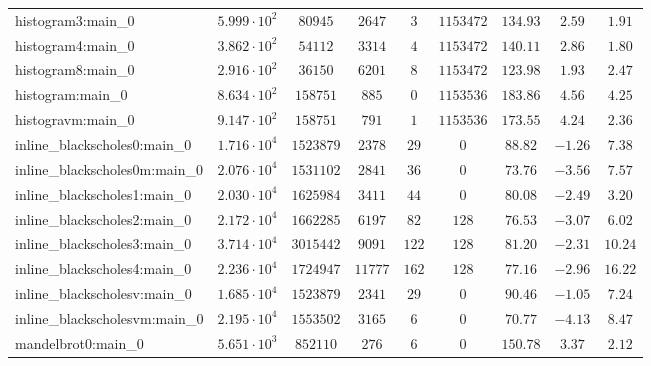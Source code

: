 \begin{tabular}{|l|c|c|c|c|c|c|c|c|}
histogram3:main\_0             & $ 5.999 \cdot 10^{2} $ & $ 80945    $ & $ 2647   $ & $ 3    $ & $ 1153472  $ & $ 134.93      $ & $ 2.59    $ & $ 1.91    $ \\
histogram4:main\_0             & $ 3.862 \cdot 10^{2} $ & $ 54112    $ & $ 3314   $ & $ 4    $ & $ 1153472  $ & $ 140.11      $ & $ 2.86    $ & $ 1.80    $ \\
histogram8:main\_0             & $ 2.916 \cdot 10^{2} $ & $ 36150    $ & $ 6201   $ & $ 8    $ & $ 1153472  $ & $ 123.98      $ & $ 1.93    $ & $ 2.47    $ \\
histogram:main\_0              & $ 8.634 \cdot 10^{2} $ & $ 158751   $ & $ 885    $ & $ 0    $ & $ 1153536  $ & $ 183.86      $ & $ 4.56    $ & $ 4.25    $ \\
histogravm:main\_0             & $ 9.147 \cdot 10^{2} $ & $ 158751   $ & $ 791    $ & $ 1    $ & $ 1153536  $ & $ 173.55      $ & $ 4.24    $ & $ 2.36    $ \\
inline\_blackscholes0:main\_0  & $ 1.716 \cdot 10^{4} $ & $ 1523879  $ & $ 2378   $ & $ 29   $ & $ 0        $ & $ 88.82       $ & $ -1.26   $ & $ 7.38    $ \\
inline\_blackscholes0m:main\_0 & $ 2.076 \cdot 10^{4} $ & $ 1531102  $ & $ 2841   $ & $ 36   $ & $ 0        $ & $ 73.76       $ & $ -3.56   $ & $ 7.57    $ \\
inline\_blackscholes1:main\_0  & $ 2.030 \cdot 10^{4} $ & $ 1625984  $ & $ 3411   $ & $ 44   $ & $ 0        $ & $ 80.08       $ & $ -2.49   $ & $ 3.20    $ \\
inline\_blackscholes2:main\_0  & $ 2.172 \cdot 10^{4} $ & $ 1662285  $ & $ 6197   $ & $ 82   $ & $ 128      $ & $ 76.53       $ & $ -3.07   $ & $ 6.02    $ \\
inline\_blackscholes3:main\_0  & $ 3.714 \cdot 10^{4} $ & $ 3015442  $ & $ 9091   $ & $ 122  $ & $ 128      $ & $ 81.20       $ & $ -2.31   $ & $ 10.24   $ \\
inline\_blackscholes4:main\_0  & $ 2.236 \cdot 10^{4} $ & $ 1724947  $ & $ 11777  $ & $ 162  $ & $ 128      $ & $ 77.16       $ & $ -2.96   $ & $ 16.22   $ \\
inline\_blackscholesv:main\_0  & $ 1.685 \cdot 10^{4} $ & $ 1523879  $ & $ 2341   $ & $ 29   $ & $ 0        $ & $ 90.46       $ & $ -1.05   $ & $ 7.24    $ \\
inline\_blackscholesvm:main\_0 & $ 2.195 \cdot 10^{4} $ & $ 1553502  $ & $ 3165   $ & $ 6    $ & $ 0        $ & $ 70.77       $ & $ -4.13   $ & $ 8.47    $ \\
mandelbrot0:main\_0            & $ 5.651 \cdot 10^{3} $ & $ 852110   $ & $ 276    $ & $ 6    $ & $ 0        $ & $ 150.78      $ & $ 3.37    $ & $ 2.12    $ \\

\end{tabular}
